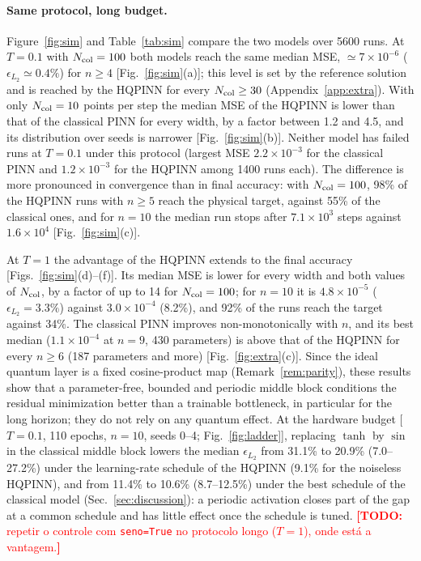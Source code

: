 \documentclass[floatfix,aps,pra,twocolumn,superscriptaddress,10pt,nofootinbib]{revtex4-2}
\newif\ifshowtodos \showtodostrue
\newcommand{\TODO}[1]{\ifshowtodos\textcolor{red}{\textbf{[TODO:} #1\textbf{]}}\fi}
\newcommand{\Ncol}{N_{\rm col}}
\begin{document}
\paragraph{Same protocol, long budget.} Figure~\ref{fig:sim} and Table~\ref{tab:sim} compare the two models over 5600 runs. At $T=0.1$ with $\Ncol=100$ both models reach the same median MSE, $\simeq7\times10^{-6}$ ($\epsilon_{L_2}\simeq0.4\%$) for $n\ge4$ [Fig.~\ref{fig:sim}(a)]; this level is set by the reference solution and is reached by the HQPINN for every $\Ncol\ge30$ (Appendix~\ref{app:extra}). With only $\Ncol=10$ points per step the median MSE of the HQPINN is lower than that of the classical PINN for every width, by a factor between 1.2 and 4.5, and its distribution over seeds is narrower [Fig.~\ref{fig:sim}(b)]. Neither model has failed runs at $T=0.1$ under this protocol (largest MSE $2.2\times10^{-3}$ for the classical PINN and $1.2\times10^{-3}$ for the HQPINN among 1400 runs each). The difference is more pronounced in convergence than in final accuracy: with $\Ncol=100$, 98\% of the HQPINN runs with $n\ge5$ reach the physical target, against 55\% of the classical ones, and for $n=10$ the median run stops after $7.1\times10^3$ steps against $1.6\times10^4$ [Fig.~\ref{fig:sim}(c)].

At $T=1$ the advantage of the HQPINN extends to the final accuracy [Figs.~\ref{fig:sim}(d)--(f)]. Its median MSE is lower for every width and both values of $\Ncol$, by a factor of up to 14 for $\Ncol=100$; for $n=10$ it is $4.8\times10^{-5}$ ($\epsilon_{L_2}=3.3\%$) against $3.0\times10^{-4}$ (8.2\%), and 92\% of the runs reach the target against 34\%. The classical PINN improves non-monotonically with $n$, and its best median ($1.1\times10^{-4}$ at $n=9$, 430 parameters) is above that of the HQPINN for every $n\ge6$ (187 parameters and more) [Fig.~\ref{fig:extra}(c)]. Since the ideal quantum layer is a fixed cosine-product map (Remark~\ref{rem:parity}), these results show that a parameter-free, bounded and periodic middle block conditions the residual minimization better than a trainable bottleneck, in particular for the long horizon; they do not rely on any quantum effect. At the hardware budget [$T=0.1$, 110 epochs, $n=10$, seeds 0--4; Fig.~\ref{fig:ladder}], replacing $\tanh$ by $\sin$ in the classical middle block lowers the median $\epsilon_{L_2}$ from 31.1\% to 20.9\% (7.0--27.2\%) under the learning-rate schedule of the HQPINN (9.1\% for the noiseless HQPINN), and from 11.4\% to 10.6\% (8.7--12.5\%) under the best schedule of the classical model (Sec.~\ref{sec:discussion}): a periodic activation closes part of the gap at a common schedule and has little effect once the schedule is tuned. \TODO{repetir o controle com \texttt{seno=True} no protocolo longo ($T=1$), onde est\'a a vantagem.}
\end{document}
